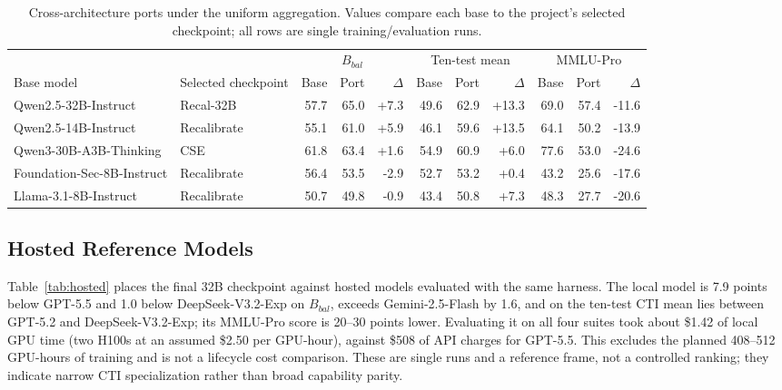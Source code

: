 \documentclass[conference]{IEEEtran}
\begin{document}
\begin{table}[t]
\caption{Cross-architecture ports under the uniform aggregation. Values compare each base to the project's selected checkpoint; all rows are single training/evaluation runs.}
\label{tab:ports}
\centering
\footnotesize
\setlength{\tabcolsep}{3.3pt}
\begin{tabular}{@{}llrrrrrrrrr@{}}
\toprule
& & \multicolumn{3}{c}{$B_{bal}$} & \multicolumn{3}{c}{Ten-test mean} & \multicolumn{3}{c}{MMLU-Pro} \\
Base model & Selected checkpoint & Base & Port & $\Delta$ & Base & Port & $\Delta$ & Base & Port & $\Delta$ \\
\midrule
Qwen2.5-32B-Instruct & Recal-32B & 57.7 & 65.0 & +7.3 & 49.6 & 62.9 & +13.3 & 69.0 & 57.4 & -11.6 \\
Qwen2.5-14B-Instruct & Recalibrate & 55.1 & 61.0 & +5.9 & 46.1 & 59.6 & +13.5 & 64.1 & 50.2 & -13.9 \\
Qwen3-30B-A3B-Thinking & CSE & 61.8 & 63.4 & +1.6 & 54.9 & 60.9 & +6.0 & 77.6 & 53.0 & -24.6 \\
Foundation-Sec-8B-Instruct & Recalibrate & 56.4 & 53.5 & -2.9 & 52.7 & 53.2 & +0.4 & 43.2 & 25.6 & -17.6 \\
Llama-3.1-8B-Instruct & Recalibrate & 50.7 & 49.8 & -0.9 & 43.4 & 50.8 & +7.3 & 48.3 & 27.7 & -20.6 \\
\bottomrule
\end{tabular}
\end{table}

\subsection{Hosted Reference Models}
Table~\ref{tab:hosted} places the final 32B checkpoint against hosted models evaluated with the same harness. The local model is 7.9 points below GPT-5.5 and 1.0 below DeepSeek-V3.2-Exp on $B_{bal}$, exceeds Gemini-2.5-Flash by 1.6, and on the ten-test CTI mean lies between GPT-5.2 and DeepSeek-V3.2-Exp; its MMLU-Pro score is 20--30 points lower. Evaluating it on all four suites took about \$1.42 of local GPU time (two H100s at an assumed \$2.50 per GPU-hour), against \$508 of API charges for GPT-5.5. This excludes the planned 408--512 GPU-hours of training and is not a lifecycle cost comparison. These are single runs and a reference frame, not a controlled ranking; they indicate narrow CTI specialization rather than broad capability parity.
\end{document}
